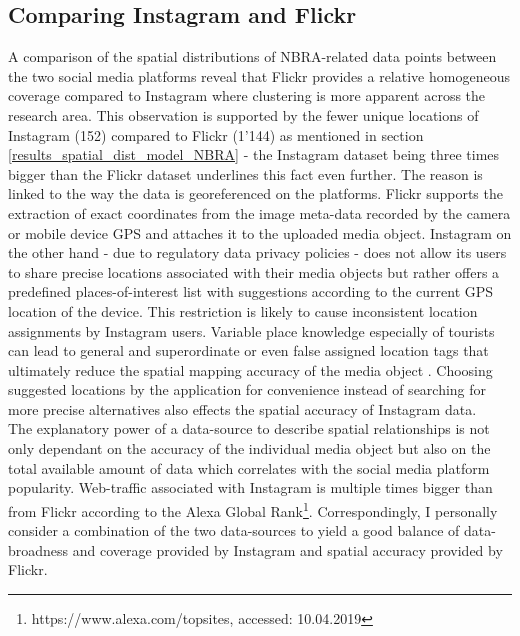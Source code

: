 \subsection{Comparing Instagram and Flickr}
A comparison of the spatial distributions of NBRA-related data points between the two social media platforms reveal that Flickr provides a relative homogeneous coverage compared to Instagram where clustering is more apparent across the research area. This observation is supported by the fewer unique locations of Instagram (152) compared to Flickr (1'144) as mentioned in section \ref{results_spatial_dist_model_NBRA} - the Instagram dataset being three times bigger than the Flickr dataset underlines this fact even further. The reason is linked to the way the data is georeferenced on the platforms. Flickr supports the extraction of exact coordinates from the image meta-data recorded by the camera or mobile device GPS and attaches it to the uploaded media object. Instagram on the other hand - due to regulatory data privacy policies - does not allow its users to share precise locations associated with their media objects but rather offers a predefined places-of-interest list with suggestions according to the current GPS location of the device. This restriction is likely to cause inconsistent location assignments by Instagram users. Variable place knowledge especially of tourists can lead to general and superordinate or even false assigned location tags that ultimately reduce the spatial mapping accuracy of the media object \parencite{Flatow2015}. Choosing suggested locations by the application for convenience instead of searching for more precise alternatives also effects the spatial accuracy of Instagram data. \\
The explanatory power of a data-source to describe spatial relationships is not only dependant on the accuracy of the individual media object but also on the total available amount of data which correlates with the social media platform popularity. Web-traffic associated with Instagram is multiple times bigger than from Flickr according to the Alexa Global Rank\footnote{https://www.alexa.com/topsites, accessed: 10.04.2019}. Correspondingly, I personally consider a combination of the two data-sources to yield a good balance of data-broadness and coverage provided by Instagram and spatial accuracy provided by Flickr.

